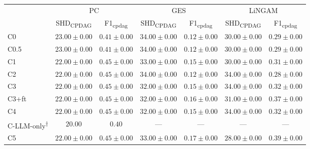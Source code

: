 \begin{tabular}{l|cc|cc|cc}
\hline
 & \multicolumn{2}{c|}{PC} & \multicolumn{2}{c|}{GES} & \multicolumn{2}{c}{LiNGAM} \\
 & SHD\textsubscript{CPDAG} & F1\textsubscript{cpdag} & SHD\textsubscript{CPDAG} & F1\textsubscript{cpdag} & SHD\textsubscript{CPDAG} & F1\textsubscript{cpdag} \\
\hline
C0 & $23.00 \pm 0.00$ & $0.41 \pm 0.00$ & $34.00 \pm 0.00$ & $0.12 \pm 0.00$ & $30.00 \pm 0.00$ & $0.29 \pm 0.00$ \\
C0.5 & $23.00 \pm 0.00$ & $0.41 \pm 0.00$ & $34.00 \pm 0.00$ & $0.12 \pm 0.00$ & $30.00 \pm 0.00$ & $0.29 \pm 0.00$ \\
C1 & $22.00 \pm 0.00$ & $0.45 \pm 0.00$ & $33.00 \pm 0.00$ & $0.15 \pm 0.00$ & $30.00 \pm 0.00$ & $0.31 \pm 0.00$ \\
C2 & $22.00 \pm 0.00$ & $0.45 \pm 0.00$ & $34.00 \pm 0.00$ & $0.12 \pm 0.00$ & $34.00 \pm 0.00$ & $0.28 \pm 0.00$ \\
C3 & $22.00 \pm 0.00$ & $0.45 \pm 0.00$ & $32.00 \pm 0.00$ & $0.15 \pm 0.00$ & $34.00 \pm 0.00$ & $0.32 \pm 0.00$ \\
C3+ft & $22.00 \pm 0.00$ & $0.45 \pm 0.00$ & $32.00 \pm 0.00$ & $0.16 \pm 0.00$ & $31.00 \pm 0.00$ & $0.37 \pm 0.00$ \\
C4 & $22.00 \pm 0.00$ & $0.45 \pm 0.00$ & $32.00 \pm 0.00$ & $0.15 \pm 0.00$ & $34.00 \pm 0.00$ & $0.32 \pm 0.00$ \\
C-LLM-only\textsuperscript{$\dagger$} & $20.00$ & $0.40$ & --- & --- & --- & --- \\ %
C5 & $22.00 \pm 0.00$ & $0.45 \pm 0.00$ & $33.00 \pm 0.00$ & $0.17 \pm 0.00$ & $28.00 \pm 0.00$ & $0.39 \pm 0.00$ \\
\hline
\end{tabular}
